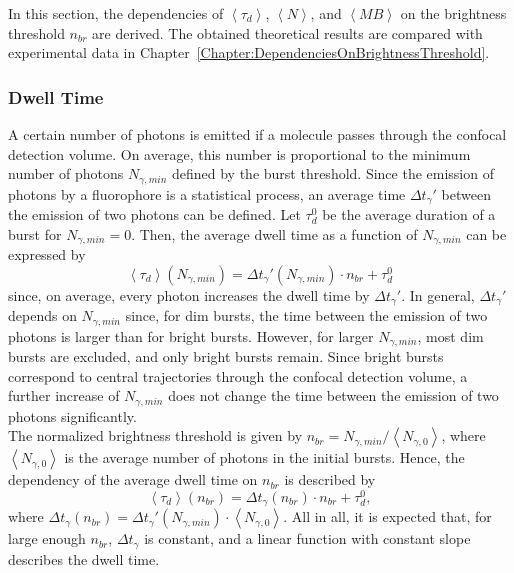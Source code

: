 In this section, the dependencies of $\left\langle \tau_d \right\rangle$, $\left\langle N \right\rangle$, and $\left\langle MB \right\rangle$ on the brightness threshold $n_{br}$ are derived. The obtained theoretical results are compared with experimental data in Chapter~\ref{Chapter:DependenciesOnBrightnessThreshold}.

\subsubsection{Dwell Time}\label{Section:DwellTime}

A certain number of photons is emitted if a molecule passes through the confocal detection volume. On average, this number is proportional to the minimum number of photons $N_{\gamma,min}$ defined by the burst threshold. Since the emission of photons by a fluorophore is a statistical process, an average time $\Delta t_{\gamma}'$ between the emission of two photons can be defined. Let $\tau_d^0$ be the average duration of a burst for $N_{\gamma,min}=0$. Then, the average dwell time as a function of $N_{\gamma,min}$ can be expressed by
\begin{equation}
	\left\langle \tau_d \right\rangle (N_{\gamma,min}) = \Delta t_{\gamma}'(N_{\gamma,min}) \cdot n_{br} + \tau_d^0
\end{equation}
since, on average, every photon increases the dwell time by $\Delta t_{\gamma}'$. In general, $\Delta t_{\gamma}'$ depends on $N_{\gamma,min}$ since, for dim bursts, the time between the emission of two photons is larger than for bright bursts. However, for larger $N_{\gamma,min}$, most dim bursts are excluded, and only bright bursts remain. Since bright bursts correspond to central trajectories through the confocal detection volume, a further increase of $N_{\gamma,min}$ does not change the time between the emission of two photons significantly. \\ 

The normalized brightness threshold is given by $n_{br} = N_{\gamma,min}/ \left\langle N_{\gamma,0} \right\rangle$, where $\left\langle N_{\gamma,0} \right\rangle$ is the average number of photons in the initial bursts. Hence, the dependency of the average dwell time on $n_{br}$ is described by
\begin{equation}
	\left\langle \tau_d \right\rangle (n_{br}) = \Delta t_{\gamma}(n_{br}) \cdot n_{br} + \tau_d^0,
\end{equation}
where $\Delta t_{\gamma}(n_{br}) = \Delta t_{\gamma}'(N_{\gamma,min}) \cdot \left\langle N_{\gamma,0} \right\rangle$. All in all, it is expected that, for large enough $n_{br}$, $\Delta t_{\gamma}$ is constant, and a linear function with constant slope describes the dwell time.

